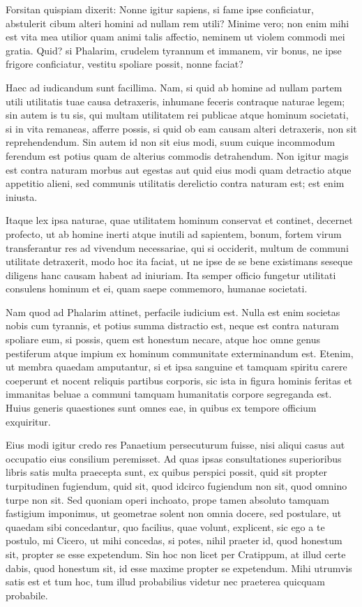  Forsitan quispiam dixerit: Nonne igitur sapiens, si fame ipse conficiatur, abstulerit cibum alteri homini ad nullam rem utili? Minime vero; non enim mihi est vita mea utilior quam animi talis affectio, neminem ut violem commodi mei gratia. Quid? si Phalarim, crudelem tyrannum et immanem, vir bonus, ne ipse frigore conficiatur, vestitu spoliare possit, nonne faciat?

 Haec ad iudicandum sunt facillima. Nam, si quid ab homine ad nullam partem utili utilitatis tuae causa detraxeris, inhumane feceris contraque naturae legem; sin autem is tu sis, qui multam utilitatem rei publicae atque hominum societati, si in vita remaneas, afferre possis, si quid ob eam causam alteri detraxeris, non sit reprehendendum. Sin autem id non sit eius modi, suum cuique incommodum ferendum est potius quam de alterius commodis detrahendum. Non igitur magis est contra naturam morbus aut egestas aut quid eius modi quam detractio atque appetitio alieni, sed communis utilitatis derelictio contra naturam est; est enim iniusta.

 Itaque lex ipsa naturae, quae utilitatem hominum conservat et continet, decernet profecto, ut ab homine inerti atque inutili ad sapientem, bonum, fortem virum transferantur res ad vivendum necessariae, qui si occiderit, multum de communi utilitate detraxerit, modo hoc ita faciat, ut ne ipse de se bene existimans seseque diligens hanc causam habeat ad iniuriam. Ita semper officio fungetur utilitati consulens hominum et ei, quam saepe commemoro, humanae societati.

 Nam quod ad Phalarim attinet, perfacile iudicium est. Nulla est enim societas nobis cum tyrannis, et potius summa distractio est, neque est contra naturam spoliare eum, si possis, quem est honestum necare, atque hoc omne genus pestiferum atque impium ex hominum communitate exterminandum est. Etenim, ut membra quaedam amputantur, si et ipsa sanguine et tamquam spiritu carere coeperunt et nocent reliquis partibus corporis, sic ista in figura hominis feritas et immanitas beluae a communi tamquam humanitatis corpore segreganda est. Huius generis quaestiones sunt omnes eae, in quibus ex tempore officium exquiritur.

 Eius modi igitur credo res Panaetium persecuturum fuisse, nisi aliqui casus aut occupatio eius consilium peremisset. Ad quas ipsas consultationes superioribus libris satis multa praecepta sunt, ex quibus perspici possit, quid sit propter turpitudinen fugiendum, quid sit, quod idcirco fugiendum non sit, quod omnino turpe non sit. Sed quoniam operi inchoato, prope tamen absoluto tamquam fastigium imponimus, ut geometrae solent non omnia docere, sed postulare, ut quaedam sibi concedantur, quo facilius, quae volunt, explicent, sic ego a te postulo, mi Cicero, ut mihi concedas, si potes, nihil praeter id, quod honestum sit, propter se esse expetendum. Sin hoc non licet per Cratippum, at illud certe dabis, quod honestum sit, id esse maxime propter se expetendum. Mihi utrumvis satis est et tum hoc, tum illud probabilius videtur nec praeterea quicquam probabile.

